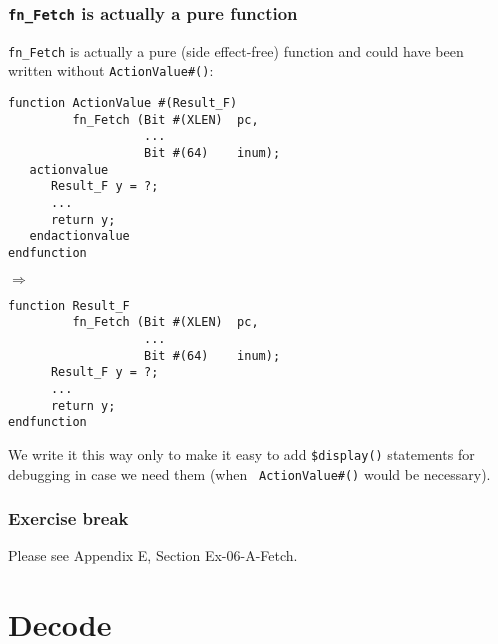 \begin{frame}[fragile]
\frametitle{{\tt fn\_Fetch} is actually a pure function}

\footnotesize

{\tt fn\_Fetch} is actually a pure (side effect-free) function and
could have been written without {\tt ActionValue\#()}:

\vspace{2ex}

\begin{minipage}{0.45\textwidth}
 \begin{Verbatim}[frame=single]
function ActionValue #(Result_F)
         fn_Fetch (Bit #(XLEN)  pc,
                   ...
                   Bit #(64)    inum);
   actionvalue
      Result_F y = ?;
      ...
      return y;
   endactionvalue
endfunction
 \end{Verbatim}
\end{minipage}
\hfill
$\Longrightarrow$
\hfill
\begin{minipage}{0.45\textwidth}
 \begin{Verbatim}[frame=single]
function Result_F
         fn_Fetch (Bit #(XLEN)  pc,
                   ...
                   Bit #(64)    inum);
      Result_F y = ?;
      ...
      return y;
endfunction
 \end{Verbatim}
\end{minipage}

\vspace{2ex}

We write it this way only to make it easy to add {\tt \$display()}
statements for debugging in case we need them (when {\tt
ActionValue\#()} would be necessary).

\end{frame}


\begin{frame}
\frametitle{\EmojiExercise \hmm Exercise break}

Please see Appendix E, Section Ex-06-A-Fetch.

\end{frame}


\section{Decode}

